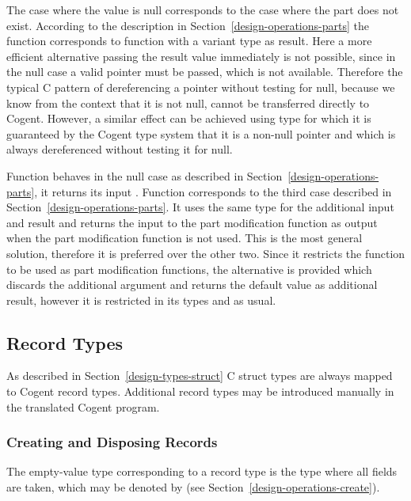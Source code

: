 The case where the  value is null corresponds to the case where the part does not exist. According to the description in
Section~\ref{design-operations-parts} the function  corresponds to function  with a variant type as result.
Here a more efficient alternative passing the result value immediately is not possible, since in the null case a valid pointer must
be passed, which is not available. Therefore the typical C pattern of dereferencing a pointer without testing for null, because
we know from the context that it is not null, cannot be transferred directly to Cogent. However, a similar effect can be achieved
using type  for which it is guaranteed by the Cogent type system that it is a non-null pointer and which is always dereferenced
without testing it for null. 

Function  behaves in the null case as described in Section~\ref{design-operations-parts}, it returns its input .
Function  corresponds to the third case described in Section~\ref{design-operations-parts}. It uses the same type
for the additional input and result and returns the input to the part modification function as output when the part modification 
function is not used. This is the most general solution, therefore it is preferred over the other two. Since it restricts the function
to be used as part modification functions, the alternative  is provided which discards the additional argument
and returns the default value  as additional result, however it is restricted in its types  and
 as usual.

\subsection{Record Types}
\label{design-operations-record}

As described in Section~\ref{design-types-struct} C struct types are always mapped to Cogent record types.
Additional record types may be introduced manually in the translated Cogent program.

\subsubsection{Creating and Disposing Records}

The empty-value type corresponding to a record type  is the type  where all fields are taken,
which may be denoted by  (see Section~\ref{design-operations-create}).

